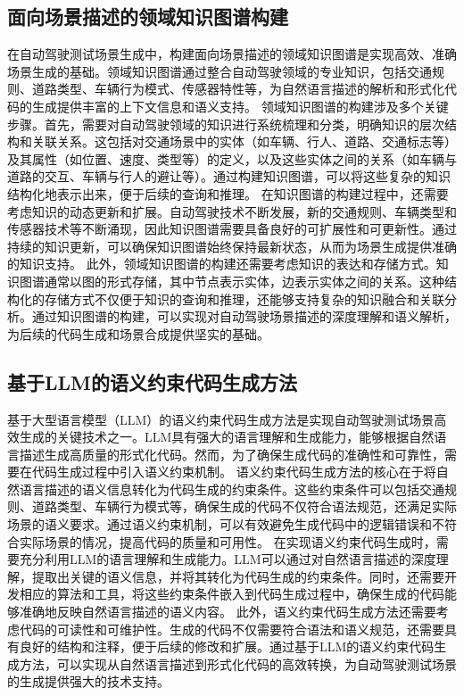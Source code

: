 \subsection{面向场景描述的领域知识图谱构建}
在自动驾驶测试场景生成中，构建面向场景描述的领域知识图谱是实现高效、准确场景生成的基础。领域知识图谱通过整合自动驾驶领域的专业知识，包括交通规则、道路类型、车辆行为模式、传感器特性等，为自然语言描述的解析和形式化代码的生成提供丰富的上下文信息和语义支持。
领域知识图谱的构建涉及多个关键步骤。首先，需要对自动驾驶领域的知识进行系统梳理和分类，明确知识的层次结构和关联关系。这包括对交通场景中的实体（如车辆、行人、道路、交通标志等）及其属性（如位置、速度、类型等）的定义，以及这些实体之间的关系（如车辆与道路的交互、车辆与行人的避让等）。通过构建知识图谱，可以将这些复杂的知识结构化地表示出来，便于后续的查询和推理。
在知识图谱的构建过程中，还需要考虑知识的动态更新和扩展。自动驾驶技术不断发展，新的交通规则、车辆类型和传感器技术等不断涌现，因此知识图谱需要具备良好的可扩展性和可更新性。通过持续的知识更新，可以确保知识图谱始终保持最新状态，从而为场景生成提供准确的知识支持。
此外，领域知识图谱的构建还需要考虑知识的表达和存储方式。知识图谱通常以图的形式存储，其中节点表示实体，边表示实体之间的关系。这种结构化的存储方式不仅便于知识的查询和推理，还能够支持复杂的知识融合和关联分析。通过知识图谱的构建，可以实现对自动驾驶场景描述的深度理解和语义解析，为后续的代码生成和场景合成提供坚实的基础。

\subsection{基于LLM的语义约束代码生成方法}
基于大型语言模型（LLM）的语义约束代码生成方法是实现自动驾驶测试场景高效生成的关键技术之一。LLM具有强大的语言理解和生成能力，能够根据自然语言描述生成高质量的形式化代码。然而，为了确保生成代码的准确性和可靠性，需要在代码生成过程中引入语义约束机制。
语义约束代码生成方法的核心在于将自然语言描述的语义信息转化为代码生成的约束条件。这些约束条件可以包括交通规则、道路类型、车辆行为模式等，确保生成的代码不仅符合语法规范，还满足实际场景的语义要求。通过语义约束机制，可以有效避免生成代码中的逻辑错误和不符合实际场景的情况，提高代码的质量和可用性。
在实现语义约束代码生成时，需要充分利用LLM的语言理解和生成能力。LLM可以通过对自然语言描述的深度理解，提取出关键的语义信息，并将其转化为代码生成的约束条件。同时，还需要开发相应的算法和工具，将这些约束条件嵌入到代码生成过程中，确保生成的代码能够准确地反映自然语言描述的语义内容。
此外，语义约束代码生成方法还需要考虑代码的可读性和可维护性。生成的代码不仅需要符合语法和语义规范，还需要具有良好的结构和注释，便于后续的修改和扩展。通过基于LLM的语义约束代码生成方法，可以实现从自然语言描述到形式化代码的高效转换，为自动驾驶测试场景的生成提供强大的技术支持。


